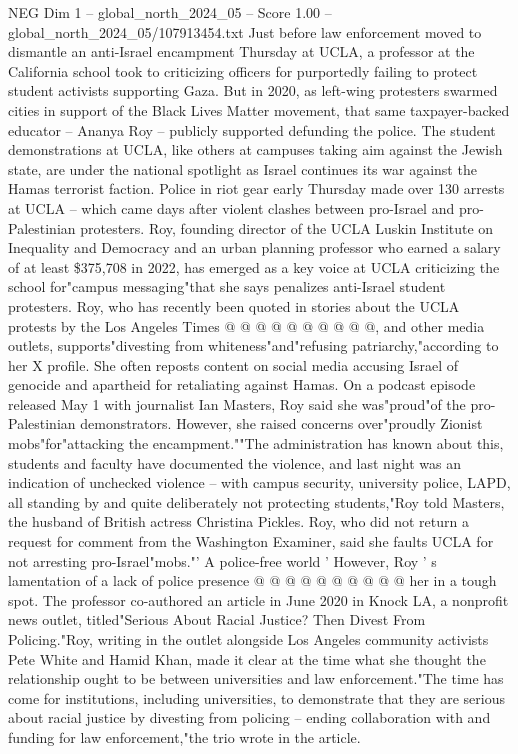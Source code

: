 \begin{textsample}{NEG Dim 1 – global\_north\_2024\_05 – Score 1.00 – global\_north\_2024\_05/107913454.txt}  \label{ex:f1_neg_050}
Just before law enforcement moved to dismantle an anti-Israel encampment Thursday at UCLA, a professor at the California school took to criticizing officers for purportedly failing to protect student activists supporting Gaza.
But in 2020, as left-wing protesters swarmed cities in support of the Black Lives Matter movement, that same taxpayer-backed educator -- Ananya Roy -- publicly supported defunding the police.
The student demonstrations at UCLA, like others at campuses taking aim against the Jewish state, are under the national spotlight as Israel continues its war against the Hamas terrorist faction.
Police in riot gear early Thursday made over 130 arrests at UCLA -- which came days after violent clashes between pro-Israel and pro-Palestinian protesters.
Roy, founding director of the UCLA Luskin Institute on Inequality and Democracy and an urban planning professor who earned a salary of at least \$375,708 in 2022, has emerged as a key voice at UCLA criticizing the school for"campus messaging"that she says penalizes anti-Israel student protesters.
Roy, who has recently been quoted in stories about the UCLA protests by the Los Angeles Times @ @ @ @ @ @ @ @ @ @, and other media outlets, supports"divesting from whiteness"and"refusing patriarchy,"according to her X profile.
She often reposts content on social media accusing Israel of genocide and apartheid for retaliating against Hamas.
On a podcast episode released May 1 with journalist Ian Masters, Roy said she was"proud"of the pro-Palestinian demonstrators.
However, she raised concerns over"proudly Zionist mobs"for"attacking the encampment.""The administration has known about this, students and faculty have documented the violence, and last night was an indication of unchecked violence -- with campus security, university police, LAPD, all standing by and quite deliberately not protecting students,"Roy told Masters, the husband of British actress Christina Pickles.
Roy, who did not return a request for comment from the Washington Examiner, said she faults UCLA for not arresting pro-Israel"mobs."' A police-free world ' However, Roy ' s lamentation of a lack of police presence @ @ @ @ @ @ @ @ @ @ her in a tough spot.
The professor co-authored an article in June 2020 in Knock LA, a nonprofit news outlet, titled"Serious About Racial Justice?
Then Divest From Policing."Roy, writing in the outlet alongside Los Angeles community activists Pete White and Hamid Khan, made it clear at the time what she thought the relationship ought to be between universities and law enforcement."The time has come for institutions, including universities, to demonstrate that they are serious about racial justice by divesting from policing -- ending collaboration with and funding for law enforcement,"the trio wrote in the article.

\end{textsample}

